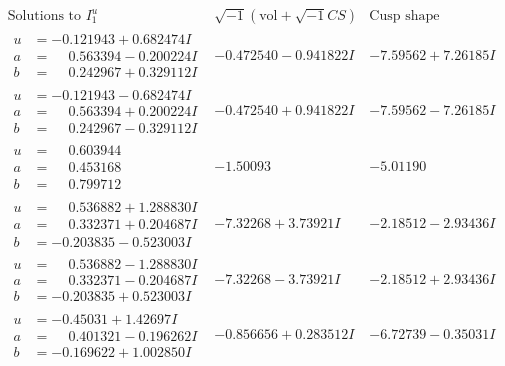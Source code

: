 \documentclass[1p]{elsarticle_modified}
\theoremstyle{definition}
\newcommand{\I}{\sqrt{-1}}
\begin{document}
$$\begin{array}{c|c|c}  
\text{Solutions to }I^u_{1}& \I (\text{vol} + \sqrt{-1}CS) & \text{Cusp shape}\\
 \hline 
\begin{aligned}
u &= -0.121943 + 0.682474 I \\
a &= \phantom{-}0.563394 - 0.200224 I \\
b &= \phantom{-}0.242967 + 0.329112 I\end{aligned}
 & -0.472540 - 0.941822 I & -7.59562 + 7.26185 I \\ \hline\begin{aligned}
u &= -0.121943 - 0.682474 I \\
a &= \phantom{-}0.563394 + 0.200224 I \\
b &= \phantom{-}0.242967 - 0.329112 I\end{aligned}
 & -0.472540 + 0.941822 I & -7.59562 - 7.26185 I \\ \hline\begin{aligned}
u &= \phantom{-}0.603944\phantom{ +0.000000I} \\
a &= \phantom{-}0.453168\phantom{ +0.000000I} \\
b &= \phantom{-}0.799712\phantom{ +0.000000I}\end{aligned}
 & -1.50093\phantom{ +0.000000I} & -5.01190\phantom{ +0.000000I} \\ \hline\begin{aligned}
u &= \phantom{-}0.536882 + 1.288830 I \\
a &= \phantom{-}0.332371 + 0.204687 I \\
b &= -0.203835 - 0.523003 I\end{aligned}
 & -7.32268 + 3.73921 I & -2.18512 - 2.93436 I \\ \hline\begin{aligned}
u &= \phantom{-}0.536882 - 1.288830 I \\
a &= \phantom{-}0.332371 - 0.204687 I \\
b &= -0.203835 + 0.523003 I\end{aligned}
 & -7.32268 - 3.73921 I & -2.18512 + 2.93436 I \\ \hline\begin{aligned}
u &= -0.45031 + 1.42697 I \\
a &= \phantom{-}0.401321 - 0.196262 I \\
b &= -0.169622 + 1.002850 I\end{aligned}
 & -0.856656 + 0.283512 I & -6.72739 - 0.35031 I \\ \hline\begin{aligned}

\end{aligned}
\end{array}$$
\end{document}
